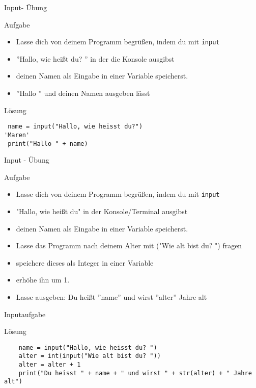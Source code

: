 \begin{frame}[fragile]{Input- Übung}   
\begin{block}{Aufgabe}
\begin{itemize}
\item Lasse dich von deinem Programm begrüßen, indem du mit \texttt{input} 
\item ''Hallo, wie heißt du? '' in der die Konsole ausgibst 
\item deinen Namen als  
Eingabe in einer Variable speicherst.
\item ''Hallo '' und deinen Namen ausgeben lässt
\end{itemize}
\end{block}
\pause{}
\begin{exampleblock}{Lösung}
\begin{lstlisting}
 name = input("Hallo, wie heisst du?")
'Maren'
 print("Hallo " + name)
\end{lstlisting}
\end{exampleblock}
\end{frame}

\begin{frame}[fragile]{Input - Übung}   
\begin{block}{Aufgabe}
	\begin{itemize}
		\item Lasse dich von deinem Programm begrüßen, indem du mit \texttt{input} 
		\item "Hallo, wie heißt du" in der Konsole/Terminal ausgibst 
		\item deinen Namen als  
		Eingabe in einer Variable speicherst.
		\item Lasse das Programm nach deinem Alter mit ("Wie alt bist du? ") fragen
		\item speichere dieses als Integer in einer Variable
		\item erhöhe ihn um 1.
		\item Lasse ausgeben: Du heißt ''name'' und wirst ''alter'' Jahre alt
	\end{itemize}
\end{block}
\end{frame}

\begin{frame}[fragile]{Inputaufgabe}
\begin{exampleblock}{Lösung}
	\begin{lstlisting}
	name = input("Hallo, wie heisst du? ")
	alter = int(input("Wie alt bist du? "))
	alter = alter + 1
	print("Du heisst " + name + " und wirst " + str(alter) + " Jahre alt")
	\end{lstlisting}
\end{exampleblock}
\end{frame}
